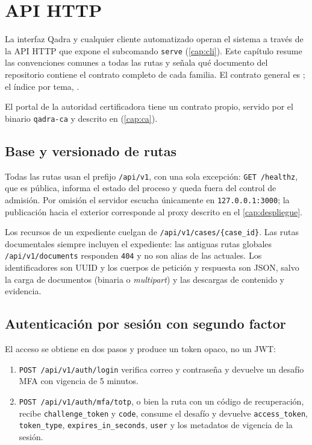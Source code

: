 \chapter{API HTTP}\label{cap:api}

La interfaz Qadra y cualquier cliente automatizado operan el sistema a través
de la API HTTP que expone el subcomando \texttt{serve} (\cref{cap:cli}). Este
capítulo resume las convenciones comunes a todas las rutas y señala qué
documento del repositorio contiene el contrato completo de cada familia. El
contrato general es ; el índice por tema,
.

El portal de la autoridad certificadora tiene un contrato propio, servido
por el binario \texttt{qadra-ca} y descrito en 
(\cref{cap:ca}).

\section{Base y versionado de rutas}\label{sec:api-base}

Todas las rutas usan el prefijo \texttt{/api/v1}, con una sola excepción:
\texttt{GET /healthz}, que es pública, informa el estado del proceso y queda
fuera del control de admisión. Por omisión el servidor escucha únicamente en
\texttt{127.0.0.1:3000}; la publicación hacia el exterior corresponde al proxy
descrito en el \cref{cap:despliegue}.

Los recursos de un expediente cuelgan de
\texttt{/api/v1/cases/\{case\_id\}}. Las rutas documentales siempre incluyen
el expediente: las antiguas rutas globales \texttt{/api/v1/documents}
responden \texttt{404} y no son alias de las actuales. Los identificadores son
UUID y los cuerpos de petición y respuesta son JSON, salvo la carga de
documentos (binaria o \emph{multipart}) y las descargas de contenido y
evidencia.

\section{Autenticación por sesión con segundo factor}\label{sec:api-auth}

El acceso se obtiene en dos pasos y produce un token opaco, no un JWT:

\begin{enumerate}
  \item \texttt{POST /api/v1/auth/login} verifica correo y contraseña y
        devuelve un desafío MFA con vigencia de 5 minutos.
  \item \texttt{POST /api/v1/auth/mfa/totp}, o bien la ruta
         con un código de recuperación,
        recibe \texttt{challenge\_token} y \texttt{code}, consume el
        desafío y devuelve \texttt{access\_token}, \texttt{token\_type},
        \texttt{expires\_in\_seconds}, \texttt{user} y los metadatos de
        vigencia de la sesión.
\end{enumerate}


